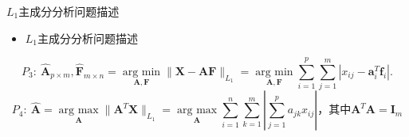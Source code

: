 \begin{frame}{$L_1$主成分分析问题描述}
    \begin{itemize}
        \item
        $L_1$主成分分析问题描述
    \end{itemize}
    \small
    \begin{equation}\label{p3}
        P_3: \ 
    \hat{\bm{A}}_{p\times m}, \hat{\bm{F}}_{m\times n} = \underset{\bm{A},\bm{F}}{\operatorname{arg\ min} } \|\bm X - \bm{A}\bm{F}\|_{L_1}
    = \underset{\bm{A}, \bm{F}}{\operatorname{arg\ min}} \sum_{i=1}^p \sum_{j=1}^m |x_{ij} - \bm a_i^T \bm f_i|.
    \end{equation}
    \begin{equation}\label{p4}
        P_4: \ \hat{\bm A} = \underset{\bm{A}}{\operatorname{arg \ max}} \| \bm A^T \bm X\|_{L_1}
        = \underset{\bm A}{\operatorname{arg\ max}} 
        \sum_{i=1}^{n}\sum_{k=1}^{m}|\sum_{j=1}^p{a}_{jk}x_{ij}|
         \text{，其中}\bm A^T\bm A = \bm I_m
    \end{equation}
\end{frame}


